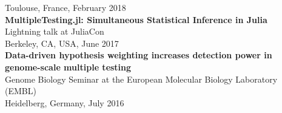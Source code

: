 \documentclass[margin,line]{res}
\begin{document}
\begin{resume}
\begin{adjustwidth*}{0pt}{0pt}
Toulouse, France, February 2018
 \\
\textbf{MultipleTesting.jl: Simultaneous Statistical Inference in Julia} \\
Lightning talk at JuliaCon \\
Berkeley, CA, USA, June 2017
 \\
\textbf{Data-driven hypothesis weighting increases detection power in genome-scale multiple testing} \\
Genome Biology Seminar at the European Molecular Biology Laboratory (EMBL) \\
Heidelberg, Germany, July 2016

\end{adjustwidth*}
\end{resume}
\end{document}

